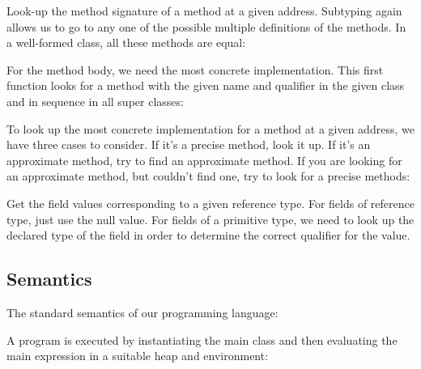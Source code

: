 Look-up the method signature of a method at a given address.
Subtyping again allows us to go to any one of the possible multiple
definitions of the methods. In a well-formed class, all these methods
are equal:

\vspace{0.5ex}
\ottdefnrmsign{}
\vspace{2.0ex}


For the method body, we need the most concrete implementation.
This first function looks for a method with the given name and
qualifier in the given class and in sequence in all super classes:

\vspace{0.5ex}
\ottdefnsmbodyc{}
\vspace{2.0ex}


To look up the most concrete implementation for a method at a given
address, we have three cases to consider.
If it's a precise method, look it up.
If it's an approximate method, try to find an approximate method.
If you are looking for an approximate method, but couldn't find one,
try to look for a precise methods:

\vspace{0.5ex}
\ottdefnrmbody{}
\vspace{2.0ex}


Get the field values corresponding to a given reference type.
For fields of reference type, just use the null value.
For fields of a primitive type, we need to look up the declared type
of the field in order to determine the correct qualifier for the
value.

\vspace{0.5ex}
\ottdefnfvsinit{}
\vspace{2.0ex}


\subsection{Semantics}

The standard semantics of our programming language:

\vspace{0.5ex}
\ottdefnsemantics{}
\vspace{2.0ex}


A program is executed by instantiating the main class and then
evaluating the main expression in a suitable heap and environment:

\vspace{0.5ex}
\ottdefnsemanticsXXprg{}
\vspace{2.0ex}


